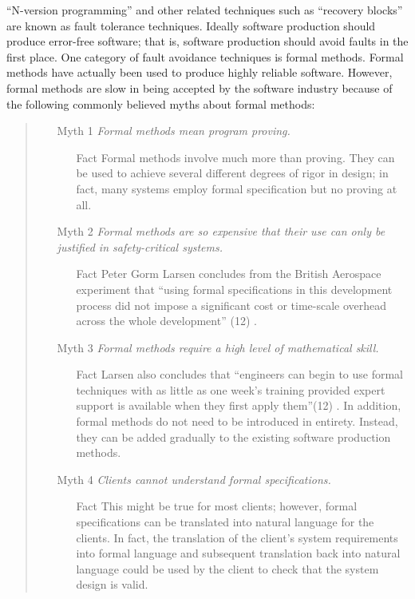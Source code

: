 \documentclass[11pt]{article}
\begin{document}
``N-version programming'' and other related techniques such as ``recovery blocks'' are known as fault tolerance techniques.  Ideally software production should produce error-free software; that is, software production should avoid faults in the first place.  One category of fault avoidance techniques is formal methods.  Formal methods have actually been used to produce highly reliable software.  However, formal methods are slow in being accepted by the software industry because of the following commonly believed myths about formal methods:
\begin{quote}
\begin{itemize}
\item[Myth 1]{\it Formal methods mean program proving.}
\begin{itemize}
\item[Fact]Formal methods involve much more than proving.  They can be used to achieve several different degrees of rigor in design; in fact, many systems employ formal specification but no proving at all.
\end{itemize}
\item[Myth 2]{\it Formal methods are so expensive that their use can only be justified in safety-critical systems.}
\begin{itemize}
\item[Fact]Peter Gorm Larsen concludes from the British Aerospace experiment that ``using formal specifications in this development process did not impose a significant cost or time-scale overhead across the whole development'' (12) \cite{PL}.
\end{itemize}
\item[Myth 3]{\it Formal methods require a high level of mathematical skill.}
\begin{itemize}
\item[Fact]Larsen also concludes that ``engineers can begin to use formal techniques with as little as one week's training provided expert support is available when they first apply them''(12) \cite{PL}.  In addition, formal methods do not need to be introduced in entirety.  Instead, they can be added gradually to the existing software production methods.
\end{itemize}
\item[Myth 4]{\it Clients cannot understand formal specifications.}
\begin{itemize}
\item[Fact]This might be true for most clients; however, formal specifications can be translated into natural language for the clients.  In fact, the translation of the client's system requirements into formal language and subsequent translation back into natural language could be used by the client to check that the system design is valid.

\end{itemize}
\end{itemize}
\end{quote}
\end{document}
